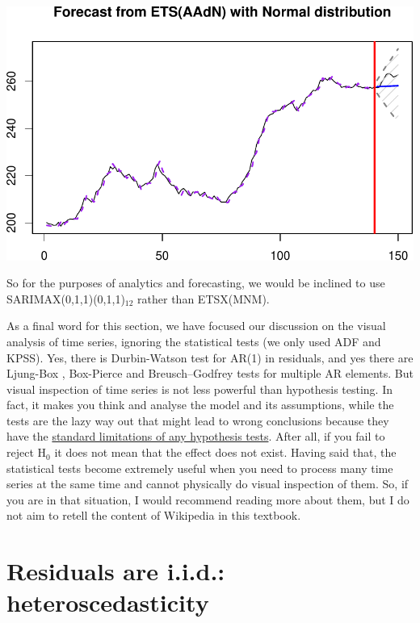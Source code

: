 \documentclass[
]{book}
\theoremstyle{definition}
\theoremstyle{definition}
\theoremstyle{definition}
\theoremstyle{definition}
\theoremstyle{remark}
\begin{document}
\includegraphics{adam_files/figure-latex/unnamed-chunk-160-1.pdf}

So for the purposes of analytics and forecasting, we would be inclined to use SARIMAX(0,1,1)(0,1,1)\(_{12}\) rather than ETSX(MNM).

As a final word for this section, we have focused our discussion on the visual analysis of time series, ignoring the statistical tests (we only used ADF and KPSS). Yes, there is Durbin-Watson \citep{WikipediaDurbinWatson2021} test for AR(1) in residuals, and yes there are Ljung-Box \citep{WikipediaLjungBox2021}, Box-Pierce and Breusch--Godfrey \citep{WikipediaBreuschGodfrey2021} tests for multiple AR elements. But visual inspection of time series is not less powerful than hypothesis testing. In fact, it makes you think and analyse the model and its assumptions, while the tests are the lazy way out that might lead to wrong conclusions because they have the \protect\hyperlink{hypothesisTesting}{standard limitations of any hypothesis tests}. After all, if you fail to reject H\(_0\) it does not mean that the effect does not exist. Having said that, the statistical tests become extremely useful when you need to process many time series at the same time and cannot physically do visual inspection of them. So, if you are in that situation, I would recommend reading more about them, but I do not aim to retell the content of Wikipedia in this textbook.

\hypertarget{diagnosticsResidualsIIDHetero}{%
\section{Residuals are i.i.d.: heteroscedasticity}\label{diagnosticsResidualsIIDHetero}}
\end{document}
